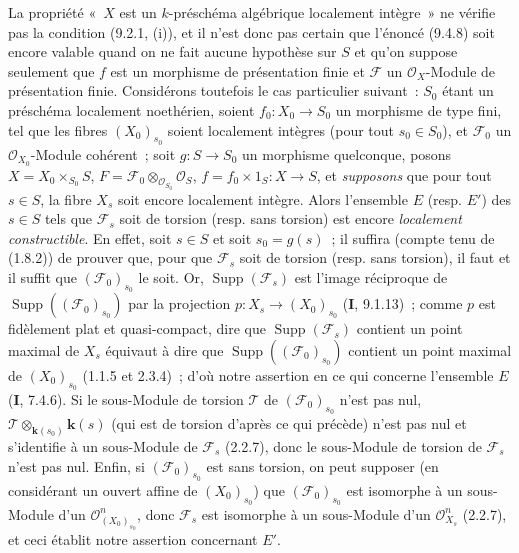 \begin{remark}[9.4.9]
\label{IV.9.4.9-fr}
La propriété «~$X$ est un $k$-préschéma algébrique localement intègre~» ne
vérifie pas la condition (9.2.1, (i)), et il n'est donc pas certain que
l'énoncé (9.4.8) soit encore valable quand on ne fait aucune hypothèse sur $S$
et qu'on suppose seulement que $f$ est un morphisme de présentation finie et
$\mathcal F$ un $\mathcal O_X$-Module de présentation finie. Considérons
toutefois le cas particulier suivant~: $S_0$ étant un préschéma localement
noethérien, soient $f_0:X_0\to S_0$ un morphisme de type fini, tel que les
fibres $(X_0)_{s_0}$ soient localement intègres (pour tout $s_0\in S_0$), et
$\mathcal F_0$ un $\mathcal O_{X_0}$-Module cohérent~; soit $g:S\to S_0$ un
morphisme quelconque, posons
$X=X_0\times_{S_0}S$, $F=\mathcal F_0\otimes_{\mathcal O_{S_0}}
\mathcal O_S$, $f=f_0\times1_S:X\to S$, et \emph{supposons} que pour tout
$s\in S$, la fibre $X_s$ soit encore localement intègre. Alors l'ensemble $E$
(resp. $E'$) des $s\in S$ tels que $\mathcal F_s$ soit de torsion (resp. sans
torsion) est encore \emph{localement constructible}. En effet, soit $s\in S$
et soit $s_0=g(s)$~; il suffira (compte tenu de (1.8.2)) de prouver que, pour
que $\mathcal F_s$ soit de torsion (resp. sans torsion), il faut et il suffit
que $(\mathcal F_0)_{s_0}$ le soit. Or,
$\operatorname{Supp}(\mathcal F_s)$ est l'image réciproque de
$\operatorname{Supp}((\mathcal F_0)_{s_0})$ par la projection
$p:X_s\to(X_0)_{s_0}$ (\textbf{I}, 9.1.13)~; comme $p$ est fidèlement plat et
quasi-compact, dire que $\operatorname{Supp}(\mathcal F_s)$ contient un point
maximal de $X_s$ équivaut à dire que
$\operatorname{Supp}((\mathcal F_0)_{s_0})$ contient un point maximal de
$(X_0)_{s_0}$ (1.1.5 et 2.3.4)~; d'où notre assertion en ce qui concerne
l'ensemble $E$ (\textbf{I}, 7.4.6). Si le sous-Module de torsion $\mathcal T$
de $(\mathcal F_0)_{s_0}$ n'est pas nul,
$\mathcal T\otimes_{\mathbf{k}(s_0)}\boldsymbol{k}(s)$ (qui est de torsion d'après ce qui précède)
n'est pas nul et s'identifie à un sous-Module de $\mathcal F_s$ (2.2.7), donc
le sous-Module de torsion de $\mathcal F_s$ n'est pas nul. Enfin, si
$(\mathcal F_0)_{s_0}$ est sans torsion, on peut supposer (en considérant un
ouvert affine de $(X_0)_{s_0}$) que $(\mathcal F_0)_{s_0}$ est isomorphe à un
sous-Module d'un $\mathcal O_{(X_0)_{s_0}}^n$, donc $\mathcal F_s$ est
isomorphe à un sous-Module d'un $\mathcal O_{X_s}^n$ (2.2.7), et ceci établit
notre assertion concernant $E'$.
\end{remark}

